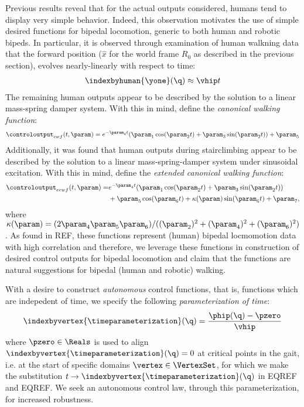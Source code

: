  Previous results reveal that for the actual outputs considered, humans tend to display very simple behavior. Indeed, this observation motivates the use of simple desired functions for bipedal locomotion, generic to both human and robotic bipeds. In particular, it is observed through examination of human walkning data that the forward position (${\hat x}$ for the world frame $R_0$ as described in the previous section), evolves nearly-linearly with respect to time:
\begin{align}
  \indexbyhuman{\yone}(\q) \approx \vhip t
\end{align}
The remaining human outputs appear to be described by the solution to a linear mass-spring damper system. With this in mind, define the \textit{canonical walking function}:
\begin{align}
 \controloutput_{cwf} (t, \param) = e^{-\param_4 t} (\param_1 \cos( \param_2 t) + \param_3 \sin(\param_2 t) ) + \param_5
\end{align}
Additionally, it was found that human outputs during stairclimbing appear to be described by the solution to a linear mass-spring-damper system under sinusoidal excitation. With this in mind, define the \textit{extended canonical walking function}:
\begin{align}
\nonumber
 \controloutput_{ecwf} (t, \param) = &e^{-\param_4 t} (\param_1 \cos( \param_2 t) + \param_3 \sin(\param_2 t) ) \\
 &+ \param_5 \cos(\param_6 t) + \kappa(\param) \sin(\param_6 t) + \param_7,
\end{align}
where $\kappa(\param) = (2\param_4\param_5\param_6)/((\param_2)^2+(\param_4)^2+(\param_6)^2)$. As found in REF, these functions represent (human) bipedal locmomotion data with high correlation and therefore, we leverage these functions in construction of desired control outputs for bipedal locomotion and claim that the functions are natural suggestions for bipedal (human and robotic) walking.

 With a desire to construct \textit{autonomous} control functions, that is, functions which are indepedent of time, we specify the following \textit{parameterization of time}:
\begin{align}
 \indexbyvertex{\timeparameterization}(\q) = \frac{\phip(\q)-\pzero}{\vhip}
\end{align}
where $\pzero \in \Reals$ is used to align $\indexbyvertex{\timeparameterization}(\q)=0$ at critical points in the gait, i.e. at the start of specific domains $\vertex \in \VertexSet$, for which we make the substitution $t \to \indexbyvertex{\timeparameterization}(\q)$ in EQREF and EQREF. We seek an autonomous control law, through this parameterization, for increased robustness.

